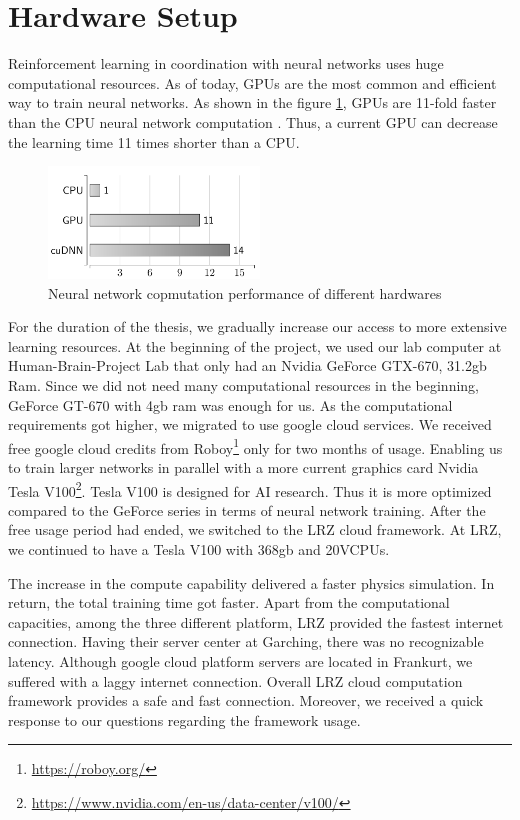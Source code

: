 \section{Hardware Setup}

Reinforcement learning in coordination with neural networks uses huge computational resources. As of today, GPUs are the most common and efficient way to train neural networks. As shown in the figure \ref{fig:cpuvsgpu}, GPUs are 11-fold faster than the CPU neural network computation \cite{Schlegel2015}. Thus, a current GPU can decrease the learning time 11 times shorter than a CPU. 

\begin{figure}[htbp]
    \centering
    \includegraphics[width=0.5\textwidth]{figures/cpuvsgpu}
    \caption{ Neural network copmutation performance of different hardwares}
    \label{fig:cpuvsgpu}
\end{figure}

For the duration of the thesis, we gradually increase our access to more extensive learning resources. At the beginning of the project, we used our lab computer at Human-Brain-Project Lab that only had an Nvidia GeForce GTX-670, 31.2gb Ram. Since we did not need many computational resources in the beginning, GeForce GT-670 with 4gb ram was enough for us. As the computational requirements got higher, we migrated to use google cloud services. We received free google cloud credits from Roboy\footnote{\url{https://roboy.org/}} only for two months of usage. Enabling us to train larger networks in parallel with a more current graphics card Nvidia Tesla V100\footnote{\url{https://www.nvidia.com/en-us/data-center/v100/}}. Tesla V100 is designed for AI research. Thus it is more optimized compared to the GeForce series in terms of neural network training. After the free usage period had ended, we switched to the LRZ cloud framework. At LRZ, we continued to have a Tesla V100 with 368gb and 20VCPUs. 

The increase in the compute capability delivered a faster physics simulation. In return, the total training time got faster. Apart from the computational capacities, among the three different platform, LRZ provided the fastest internet connection. Having their server center at Garching, there was no recognizable latency. Although google cloud platform servers are located in Frankurt, we suffered with a laggy internet connection. 
Overall LRZ cloud computation framework provides a safe and fast connection. Moreover, we received a quick response to our questions regarding the framework usage.

